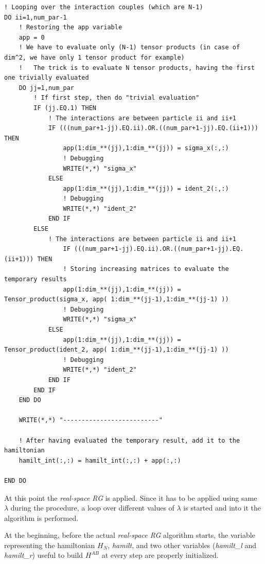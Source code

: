 \documentclass[12pt, a4paper, notitlepage]{report}
\begin{document}
\begin{lstlisting}
! Looping over the interaction couples (which are N-1)
DO ii=1,num_par-1
	! Restoring the app variable
	app = 0
	! We have to evaluate only (N-1) tensor products (in case of dim^2, we have only 1 tensor product for example)
	!	The trick is to evaluate N tensor products, having the first one trivially evaluated
	DO jj=1,num_par
		! If first step, then do "trivial evaluation"
		IF (jj.EQ.1) THEN
			! The interactions are between particle ii and ii+1
			IF (((num_par+1-jj).EQ.ii).OR.((num_par+1-jj).EQ.(ii+1))) THEN
				app(1:dim_**(jj),1:dim_**(jj)) = sigma_x(:,:)
				! Debugging
				WRITE(*,*) "sigma_x"
			ELSE
				app(1:dim_**(jj),1:dim_**(jj)) = ident_2(:,:)
				! Debugging
				WRITE(*,*) "ident_2"
			END IF
		ELSE
			! The interactions are between particle ii and ii+1
				IF (((num_par+1-jj).EQ.ii).OR.((num_par+1-jj).EQ.(ii+1))) THEN
				! Storing increasing matrices to evaluate the temporary results
				app(1:dim_**(jj),1:dim_**(jj)) = Tensor_product(sigma_x, app( 1:dim_**(jj-1),1:dim_**(jj-1) ))
				! Debugging
				WRITE(*,*) "sigma_x"
			ELSE
				app(1:dim_**(jj),1:dim_**(jj)) = Tensor_product(ident_2, app( 1:dim_**(jj-1),1:dim_**(jj-1) ))
				! Debugging
				WRITE(*,*) "ident_2"
			END IF
		END IF
	END DO
	
	WRITE(*,*) "--------------------------"
	
	! After having evaluated the temporary result, add it to the hamiltonian
	hamilt_int(:,:) = hamilt_int(:,:) + app(:,:)

END DO
\end{lstlisting}

At this point the \textit{real-space RG} is applied. Since it has to be applied using same $\lambda$ during the procedure, a loop over different values of $\lambda$ is started and into it the algorithm is performed.

At the beginning, before the actual \textit{real-space RG} algorithm starts, the variable representing the hamiltonian $H_N$, \textit{hamilt}, and two other variables (\textit{hamilt\_l} and \textit{hamilt\_r}) useful to build $H^{AB}$ at every step are properly initialized.
\end{document}
